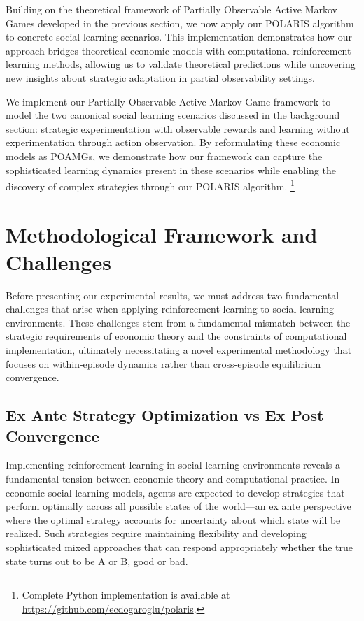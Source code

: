 Building on the theoretical framework of Partially Observable Active Markov Games developed in the previous section, we now apply our POLARIS algorithm to concrete social learning scenarios. This implementation demonstrates how our approach bridges theoretical economic models with computational reinforcement learning methods, allowing us to validate theoretical predictions while uncovering new insights about strategic adaptation in partial observability settings.

We implement our Partially Observable Active Markov Game framework to model the two canonical social learning scenarios discussed in the background section: strategic experimentation with observable rewards and learning without experimentation through action observation. By reformulating these economic models as POAMGs, we demonstrate how our framework can capture the sophisticated learning dynamics present in these scenarios while enabling the discovery of complex strategies through our POLARIS algorithm. \footnote{Complete Python implementation is available at \url{https://github.com/ecdogaroglu/polaris}.}

\section{Methodological Framework and Challenges}

Before presenting our experimental results, we must address two fundamental challenges that arise when applying reinforcement learning to social learning environments. These challenges stem from a fundamental mismatch between the strategic requirements of economic theory and the constraints of computational implementation, ultimately necessitating a novel experimental methodology that focuses on within-episode dynamics rather than cross-episode equilibrium convergence.

\subsection{Ex Ante Strategy Optimization vs Ex Post Convergence}

Implementing reinforcement learning in social learning environments reveals a fundamental tension between economic theory and computational practice. In economic social learning models, agents are expected to develop strategies that perform optimally across all possible states of the world—an ex ante perspective where the optimal strategy accounts for uncertainty about which state will be realized. Such strategies require maintaining flexibility and developing sophisticated mixed approaches that can respond appropriately whether the true state turns out to be A or B, good or bad.

